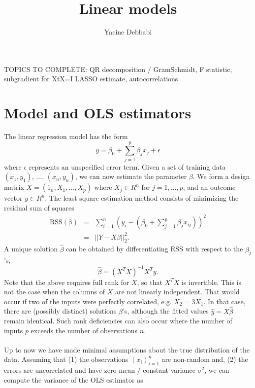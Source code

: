 \documentclass[]{article}
\title{\textbf{Linear models}}
\author{Yacine Debbabi}
\begin{document}
\maketitle

\tableofcontents

\noindent TOPICS TO COMPLETE: QR decomposition / GramSchmidt, F statistic, subgradient for XtX=I LASSO estimate, autocorrelations

\section{Model and OLS estimators}

The linear regression model has the form
\begin{equation}
y = \beta_0 + \sum_{j=1}^p \beta_j x_j + \epsilon
\end{equation}
where $\epsilon$ represents an unspecified error term. Given a set of training data $(x_1,y_1)$, ..., $(x_n,y_n)$, we can now estimate the parameter $\beta$. We form a design matrix $X=(1_n,X_1,...,X_p)$ where $X_j\in R^n$ for $j=1,...,p$, and an outcome vector $y\in R^n$. The least square estimation method consists of minimizing the residual sum of squares
\begin{eqnarray}
\mathrm{RSS(\beta)}&=&\sum_{i=1}^n \left(y_i-\left(\beta_0 + \sum_{j=1}^p \beta_j x_{ij}\right)\right)^2\\
&=&||Y-X\beta ||_2^2.
\end{eqnarray}
A unique solution $\hat{\beta}$ can be obtained by differentiating RSS with respect to the $\beta_j$'s,
\begin{equation}
\hat{\beta}=(X^TX)^{-1}X^Ty.
\end{equation}
\noindent Note that the above requires full rank for $X$, so that $X^TX$ is invertible. This is not the case when the columns of $X$ are not linearly independent. That would occur if two of the inputs were perfectly correlated, e.g. $X_2=3X_1$. In that case, there are (possibly distinct) solutions $\hat{\beta}$'s, although the fitted values $\hat{y}=X\hat{\beta}$ remain identical. Such rank deficiencies can also occur where the number of inputs $p$ exceeds the number of observations $n$. \\ \\
\noindent Up to now we have made minimal assumptions about the true distribution of the data. Assuming that (1) the observations $(x_i)_{i=1}^n$ are non-random and, (2) the errors are uncorrelated and have zero mean / constant variance $\sigma^2$, we can compute the variance of the OLS estimator as
\end{document}
